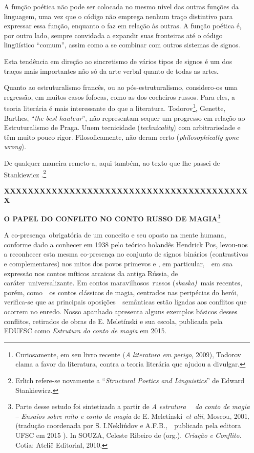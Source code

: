 A função poética não pode ser colocada no mesmo nível das outras funções
da linguagem, uma vez que o código não emprega nenhum traço distintivo
para expressar essa função, enquanto o faz em relação às outras. A
função poética é, por outro lado, sempre convidada a expandir suas
fronteiras até o código lingüístico ``comum'', assim como a se combinar
com outros sistemas de signos.

Esta tendência em direção ao sincretismo de vários tipos de signos é um
dos traços mais importantes não só da arte verbal quanto de todas as
artes.

Quanto ao estruturalismo francês, ou ao pós-estruturalismo, considero-os
uma regressão, em muitos casos fofocas, como as dos cocheiros russos.
Para eles, a teoria literária é mais interessante do que a literatura.
Todorov\footnote{Curiosamente, em seu livro recente (\emph{A literatura
  em perigo}, 2009), Todorov clama a favor da literatura, contra a
  teoria literária que ajudou a divulgar.}, Genette, Barthes,
``\emph{the best hauteur}'', não representam sequer um progresso em
relação ao\\
Estruturalismo de Praga. Unem tecnicidade (\emph{technicality}) com
arbitrariedade e têm muito pouco rigor. Filosoficamente, não deram certo
(\emph{philosophically gone wrong}).

De qualquer maneira remeto-a, aqui também, ao texto que lhe passei de
Stankiewicz .\footnote{Erlich refere-se novamente a ``\emph{Structural
  Poetics and Linguistics}'' de Edward Stankiewicz.}

\textbf{XXXXXXXXXXXXXXXXXXXXXXXXXXXXXXXXXXXXXXXXXX}

\textbf{O PAPEL DO CONFLITO NO CONTO RUSSO DE MAGIA}\footnote{Parte
  desse estudo foi sintetizada a partir de \emph{A estrutura} ~~\emph{do
  conto de magia} -- \emph{Ensaios sobre mito e conto de magia} de E.
  Meletínski~\emph{et alii}, Moscou, 2001, (tradução coordenada por S.
  I.Nekliúdov e A.F.B.,~~publicada pela editora UFSC em 2015 ). In
  SOUZA, Celeste Ribeiro de (org.). \emph{Criação e Conflito}. Cotia:
  Ateliê Editorial, 2010.}

A co-presença~obrigatória de um conceito e seu oposto na mente humana,
conforme dado a conhecer em 1938 pelo teórico holandês Hendrick Pos,
levou-nos a reconhecer esta mesma co-presença no conjunto de signos
binários (contrastivos e complementares) nos mitos dos povos primevos e
, em particular,~~em sua expressão nos contos míticos arcaicos da antiga
Rússia, de caráter~universalizante. Em contos maravilhosos~russos
(\emph{skaska)~}mais recentes, porém, como~~os contos clássicos de
magia, centrados nas peripécias do herói, verifica-se que as principais
oposições~~semânticas estão ligadas aos conflitos que ocorrem no enredo.
Nosso apanhado apresenta alguns exemplos básicos desses conflitos,
retirados de obras de E. Meletínski e sua escola, publicada pela EDUFSC
como \emph{Estrutura do conto de magia} em 2015.

